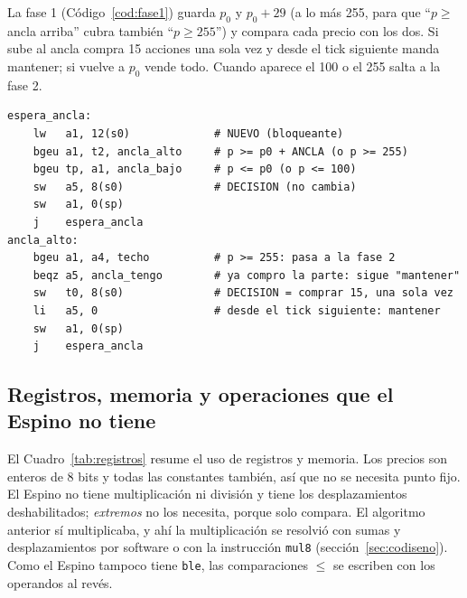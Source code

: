 \documentclass[11pt,letterpaper]{article}
\begin{document}
La fase 1 (Código~\ref{cod:fase1}) guarda $p_0$ y $p_0 + 29$ (a lo más 255, para que ``$p \ge$ ancla arriba''
cubra también ``$p \ge 255$'') y compara cada precio con los dos. Si sube al ancla compra 15 acciones una
sola vez y desde el tick siguiente manda mantener; si vuelve a $p_0$ vende todo. Cuando aparece el 100 o el
255 salta a la fase 2.

\begin{lstlisting}[caption={Fase 1 de \texttt{trade.s}: el ancla.},label={cod:fase1}]
espera_ancla:
    lw   a1, 12(s0)             # NUEVO (bloqueante)
    bgeu a1, t2, ancla_alto     # p >= p0 + ANCLA (o p >= 255)
    bgeu tp, a1, ancla_bajo     # p <= p0 (o p <= 100)
    sw   a5, 8(s0)              # DECISION (no cambia)
    sw   a1, 0(sp)
    j    espera_ancla
ancla_alto:
    bgeu a1, a4, techo          # p >= 255: pasa a la fase 2
    beqz a5, ancla_tengo        # ya compro la parte: sigue "mantener"
    sw   t0, 8(s0)              # DECISION = comprar 15, una sola vez
    li   a5, 0                  # desde el tick siguiente: mantener
    sw   a1, 0(sp)
    j    espera_ancla
\end{lstlisting}

\subsection{Registros, memoria y operaciones que el Espino no tiene}

El Cuadro~\ref{tab:registros} resume el uso de registros y memoria. Los precios son enteros de 8 bits y
todas las constantes también, así que no se necesita punto fijo. El Espino no tiene multiplicación ni
división y tiene los desplazamientos deshabilitados; \emph{extremos} no los necesita, porque solo compara.
El algoritmo anterior sí multiplicaba, y ahí la multiplicación se resolvió con sumas y desplazamientos por
software o con la instrucción \texttt{mul8} (sección~\ref{sec:codiseno}). Como el Espino tampoco tiene
\texttt{ble}, las comparaciones $\le$ se escriben con los operandos al revés.
\end{document}
